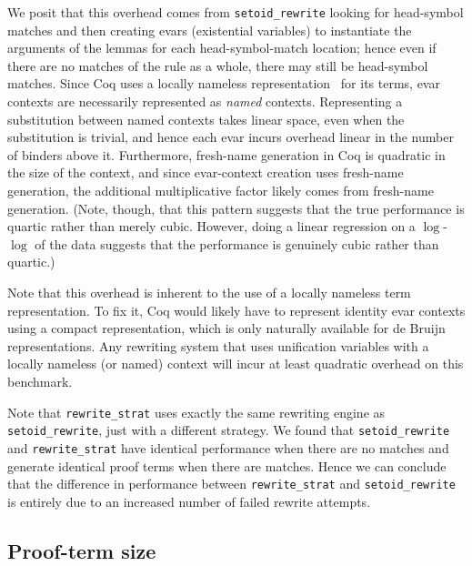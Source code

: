 \documentclass[a4paper,USenglish,cleveref,autoref,thm-restate]{lipics-v2021}
\newcommand{\todo}[1]{\textcolor{red}{\textbf{TODO: #1}}}
\begin{document}
We posit that this overhead comes from \texttt{setoid_rewrite} looking for head-symbol matches and then creating evars (existential variables) to instantiate the arguments of the lemmas for each head-symbol-match location; hence even if there are no matches of the rule as a whole, there may still be head-symbol matches.
Since Coq uses a locally nameless representation~\cite{LocallyNameless} for its terms, evar contexts are necessarily represented as \emph{named} contexts.
Representing a substitution between named contexts takes linear space, even when the substitution is trivial, and hence each evar incurs overhead linear in the number of binders above it.
Furthermore, fresh-name generation in Coq is quadratic in the size of the context, and since evar-context creation uses fresh-name generation, the additional multiplicative factor likely comes from fresh-name generation.
(Note, though, that this pattern suggests that the true performance is quartic rather than merely cubic.
However, doing a linear regression on a $\log$-$\log$ of the data suggests that the performance is genuinely cubic rather than quartic.)

Note that this overhead is inherent to the use of a locally nameless term representation.
To fix it, Coq would likely have to represent identity evar contexts using a compact representation, which is only naturally available for de Bruijn representations.
Any rewriting system that uses unification variables with a locally nameless (or named) context will incur at least quadratic overhead on this benchmark.

Note that \texttt{rewrite_strat} uses exactly the same rewriting engine as \texttt{setoid_rewrite}, just with a different strategy.
We found that \texttt{setoid_rewrite} and \texttt{rewrite_strat} have identical performance when there are no matches and generate identical proof terms when there are matches.
Hence we can conclude that the difference in performance between \texttt{rewrite_strat} and \texttt{setoid_rewrite} is entirely due to an increased number of failed rewrite attempts.

\subsection{Proof-term size}
\end{document}
